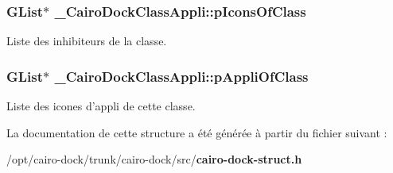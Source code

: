 \subsubsection{\setlength{\rightskip}{0pt plus 5cm}GList$\ast$ {\bf \_\-CairoDockClassAppli::pIconsOfClass}}\label{struct__CairoDockClassAppli_aafef7ebcd0db62cce951d3a28cd9582}


Liste des inhibiteurs de la classe. 

\subsubsection{\setlength{\rightskip}{0pt plus 5cm}GList$\ast$ {\bf \_\-CairoDockClassAppli::pAppliOfClass}}\label{struct__CairoDockClassAppli_e004543f521c6f781b679ce83ad614ba}


Liste des icones d'appli de cette classe. 



La documentation de cette structure a été générée à partir du fichier suivant :\begin{CompactItemize}
\item 
/opt/cairo-dock/trunk/cairo-dock/src/{\bf cairo-dock-struct.h}\end{CompactItemize}
